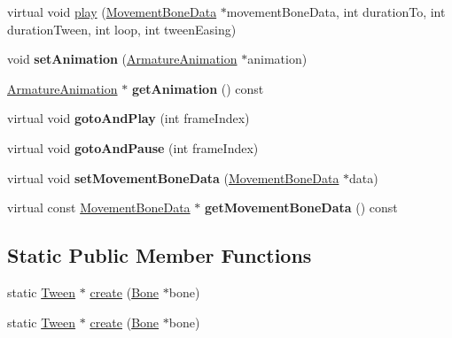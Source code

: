 \begin{DoxyCompactItemize}
\item 
virtual void \hyperlink{classcocostudio_1_1Tween_a67c7a90707cc12aca87792e8911b5632}{play} (\hyperlink{classcocostudio_1_1MovementBoneData}{Movement\+Bone\+Data} $\ast$movement\+Bone\+Data, int duration\+To, int duration\+Tween, int loop, int tween\+Easing)
\item 
\mbox{\label{classcocostudio_1_1Tween_a9f35b2207d2e1d1bab93370532fdd12f}} 
void {\bfseries set\+Animation} (\hyperlink{classcocostudio_1_1ArmatureAnimation}{Armature\+Animation} $\ast$animation)
\item 
\mbox{\label{classcocostudio_1_1Tween_ab47d9af1042174dccbf8d529a859cc1b}} 
\hyperlink{classcocostudio_1_1ArmatureAnimation}{Armature\+Animation} $\ast$ {\bfseries get\+Animation} () const
\item 
\mbox{\label{classcocostudio_1_1Tween_a9a04a44fa068d26fa0f324044956529d}} 
virtual void {\bfseries goto\+And\+Play} (int frame\+Index)
\item 
\mbox{\label{classcocostudio_1_1Tween_a0e4733a03e6cad9fe3928f3c66a5bd6f}} 
virtual void {\bfseries goto\+And\+Pause} (int frame\+Index)
\item 
\mbox{\label{classcocostudio_1_1Tween_a547c37fb52d21a77009d0b74216cf2d1}} 
virtual void {\bfseries set\+Movement\+Bone\+Data} (\hyperlink{classcocostudio_1_1MovementBoneData}{Movement\+Bone\+Data} $\ast$data)
\item 
\mbox{\label{classcocostudio_1_1Tween_ac897f94d5d502a48e19398ebffd45b23}} 
virtual const \hyperlink{classcocostudio_1_1MovementBoneData}{Movement\+Bone\+Data} $\ast$ {\bfseries get\+Movement\+Bone\+Data} () const
\end{DoxyCompactItemize}
\subsection*{Static Public Member Functions}
\begin{DoxyCompactItemize}
\item 
static \hyperlink{classcocostudio_1_1Tween}{Tween} $\ast$ \hyperlink{classcocostudio_1_1Tween_aebcfa6470c9ce925159d7096bb144827}{create} (\hyperlink{classcocostudio_1_1Bone}{Bone} $\ast$bone)
\item 
static \hyperlink{classcocostudio_1_1Tween}{Tween} $\ast$ \hyperlink{classcocostudio_1_1Tween_a36fbe5ae4133df267d4054cf6106c7d2}{create} (\hyperlink{classcocostudio_1_1Bone}{Bone} $\ast$bone)
\end{DoxyCompactItemize}
